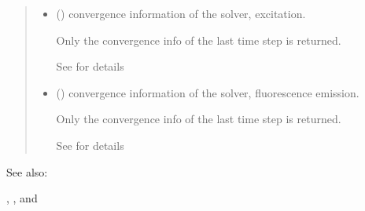 \documentclass[letterpaper,10pt,english]{sphinxmanual}
\begin{document}
\begin{fulllineitems}
\begin{quote}
\begin{description}
\begin{itemize}
\sphinxAtStartPar
If  is set and  is set to , internal TPSF data will be represented in volumetric space

\sphinxAtStartPar
See {\hyperref[\detokenize{_autosummary/nirfasterff.base.data.flTPSFdata:nirfasterff.base.data.flTPSFdata}]{}} for details.

\item {} 
\sphinxAtStartPar
{} () \textendash{} convergence information of the solver, excitation.

\sphinxAtStartPar
Only the convergence info of the last time step is returned.

\sphinxAtStartPar
See {\hyperref[\detokenize{_autosummary/nirfasterff.utils.ConvergenceInfo:nirfasterff.utils.ConvergenceInfo}]{}} for details

\item {} 
\sphinxAtStartPar
{} () \textendash{} convergence information of the solver, fluorescence emission.

\sphinxAtStartPar
Only the convergence info of the last time step is returned.

\sphinxAtStartPar
See {\hyperref[\detokenize{_autosummary/nirfasterff.utils.ConvergenceInfo:nirfasterff.utils.ConvergenceInfo}]{}} for details

\end{itemize}


\end{description}\end{quote}


\begin{sphinxseealso}{See also:}

\sphinxAtStartPar
{\hyperref[\detokenize{_autosummary/nirfasterff.math.gen_mass_matrix:nirfasterff.math.gen_mass_matrix}]{}}, {\hyperref[\detokenize{_autosummary/nirfasterff.math.get_field_TR:nirfasterff.math.get_field_TR}]{}}, and {\hyperref[\detokenize{_autosummary/nirfasterff.math.get_field_TRFL:nirfasterff.math.get_field_TRFL}]{}}


\end{sphinxseealso}


\end{fulllineitems}
\end{document}
